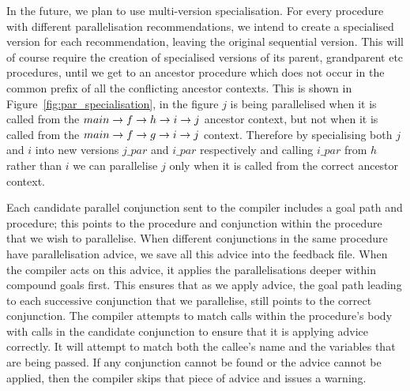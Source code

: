 In the future, we plan to use multi-version specialisation.
For every procedure with different parallelisation recommendations,
we intend to create a specialised version for each recommendation,
leaving the original sequential version.
This will of course require the creation of specialised versions
of its parent, grandparent etc procedures,
until we get to an ancestor procedure
which does not occur in the common prefix of all the conflicting ancestor contexts.
This is shown in Figure~\ref{fig:par_specialisation}, in the figure $j$ is
being parallelised when it is called from the
$main \rightarrow f \rightarrow h \rightarrow i \rightarrow j$ ancestor context,
but not when it is called from the $main \rightarrow f \rightarrow g \rightarrow i \rightarrow j$
context.
Therefore by specialising both $j$ and $i$ into new versions 
$j\_par$ and $i\_par$ respectively and calling $i\_par$ from $h$ rather than
$i$ we can parallelise $j$ only when it is called from the correct ancestor
context.

Each candidate parallel conjunction sent to the compiler includes a goal
path and procedure;
this points to the procedure and conjunction within the procedure that we
wish to parallelise.
When different conjunctions in the same procedure have parallelisation
advice, we save all this advice into the feedback file.
When the compiler acts on this advice,
it applies the parallelisations deeper within compound goals first.
This ensures that as we apply advice,
the goal path leading to each
successive conjunction that we parallelise, still points to the correct
conjunction.
The compiler attempts to match calls within the procedure's body with calls
in the candidate conjunction to ensure that it is applying advice correctly.
It will attempt to match both the callee's name and the variables that are
being passed.
If any conjunction cannot be found or the advice cannot be applied,
then the compiler skips that piece of advice and issues a warning.

%
%
%

